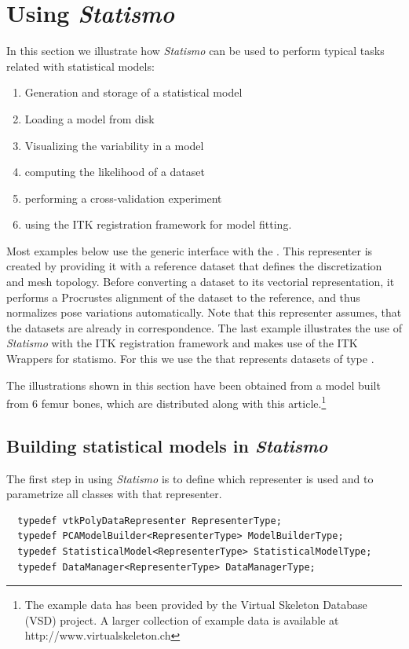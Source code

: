\documentclass{InsightArticle}
\newcommand{\Statismo}{\emph{Statismo}\xspace}
\begin{document}
\section{Using \Statismo}
In this section we illustrate how \Statismo can be used to perform typical tasks related with statistical models:
\begin{enumerate}
  \item Generation and storage of a statistical model
  \item Loading a model from disk
  \item Visualizing the variability in  a model
  \item computing the likelihood of a dataset
  \item performing a cross-validation experiment
  \item using the ITK registration framework for model fitting. 
\end{enumerate}
Most examples below use  the generic
interface with the . This representer is
created by providing it with a reference dataset that defines the
discretization and mesh topology. Before converting a dataset to its
vectorial representation, it performs a Procrustes alignment
\cite{horn_closed-form_1987} of the dataset to the reference, and thus normalizes pose
variations automatically. Note that this representer assumes, that the
datasets are already in correspondence.
The last example illustrates the use of \Statismo with the ITK
registration framework and makes use of the ITK Wrappers for
statismo. For this we use the  that represents datasets
of type . 

The illustrations shown in this section have been obtained from a model built from 6 femur bones, 
which are distributed along with this article.\footnote{The example data has been provided by the Virtual Skeleton Database (VSD) project. A larger collection of example data is available at http://www.virtualskeleton.ch}




\subsection{Building statistical models in \Statismo}

The first step in using \Statismo is to define which representer is used and to parametrize all classes with that 
representer. 
\begin{verbatim}
  typedef vtkPolyDataRepresenter RepresenterType;
  typedef PCAModelBuilder<RepresenterType> ModelBuilderType;
  typedef StatisticalModel<RepresenterType> StatisticalModelType;
  typedef DataManager<RepresenterType> DataManagerType;
\end{verbatim}
\end{document}
